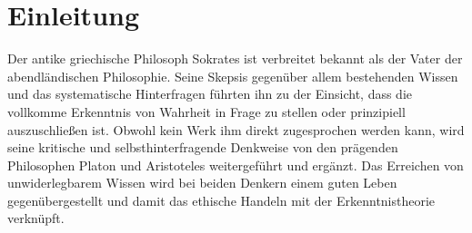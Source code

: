 \section*{Einleitung}

Der antike griechische Philosoph Sokrates ist verbreitet bekannt als der Vater der abendländischen Philosophie.
Seine Skepsis gegenüber allem bestehenden Wissen und das systematische Hinterfragen führten ihn zu der Einsicht,
dass die vollkomme Erkenntnis von Wahrheit in Frage zu stellen oder prinzipiell auszuschließen ist.
Obwohl kein Werk ihm direkt zugesprochen werden kann, wird seine kritische und selbsthinterfragende Denkweise
von den prägenden Philosophen Platon und Aristoteles weitergeführt und ergänzt. 
Das Erreichen von unwiderlegbarem Wissen wird bei beiden Denkern einem guten Leben gegenübergestellt und damit 
das ethische Handeln mit der Erkenntnistheorie verknüpft.
